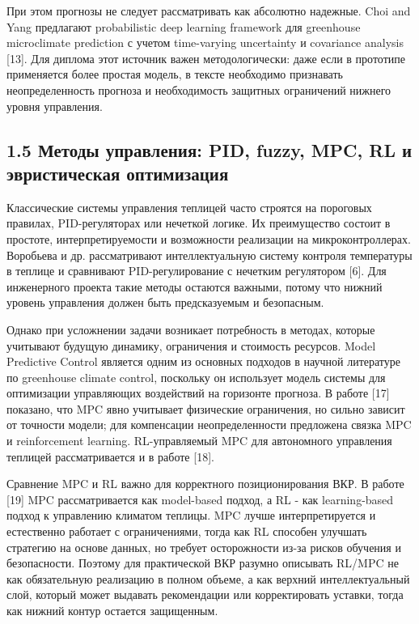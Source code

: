 \documentclass[a4paper,14pt]{extarticle}
\begin{document}
При этом прогнозы не следует рассматривать как абсолютно надежные. Choi
and Yang предлагают probabilistic deep learning framework для greenhouse
microclimate prediction с учетом time-varying uncertainty и covariance
analysis {[}13{]}. Для диплома этот источник важен методологически: даже
если в прототипе применяется более простая модель, в тексте необходимо
признавать неопределенность прогноза и необходимость защитных
ограничений нижнего уровня управления.

\hypertarget{ux43cux435ux442ux43eux434ux44b-ux443ux43fux440ux430ux432ux43bux435ux43dux438ux44f-pid-fuzzy-mpc-rl-ux438-ux44dux432ux440ux438ux441ux442ux438ux447ux435ux441ux43aux430ux44f-ux43eux43fux442ux438ux43cux438ux437ux430ux446ux438ux44f}{%
\subsection{1.5 Методы управления: PID, fuzzy, MPC, RL и эвристическая
оптимизация}\label{ux43cux435ux442ux43eux434ux44b-ux443ux43fux440ux430ux432ux43bux435ux43dux438ux44f-pid-fuzzy-mpc-rl-ux438-ux44dux432ux440ux438ux441ux442ux438ux447ux435ux441ux43aux430ux44f-ux43eux43fux442ux438ux43cux438ux437ux430ux446ux438ux44f}}

Классические системы управления теплицей часто строятся на пороговых
правилах, PID-регуляторах или нечеткой логике. Их преимущество состоит в
простоте, интерпретируемости и возможности реализации на
микроконтроллерах. Воробьева и др. рассматривают интеллектуальную
систему контроля температуры в теплице и сравнивают PID-регулирование с
нечетким регулятором {[}6{]}. Для инженерного проекта такие методы
остаются важными, потому что нижний уровень управления должен быть
предсказуемым и безопасным.

Однако при усложнении задачи возникает потребность в методах, которые
учитывают будущую динамику, ограничения и стоимость ресурсов. Model
Predictive Control является одним из основных подходов в научной
литературе по greenhouse climate control, поскольку он использует модель
системы для оптимизации управляющих воздействий на горизонте прогноза. В
работе {[}17{]} показано, что MPC явно учитывает физические ограничения,
но сильно зависит от точности модели; для компенсации неопределенности
предложена связка MPC и reinforcement learning. RL-управляемый MPC для
автономного управления теплицей рассматривается и в работе {[}18{]}.

Сравнение MPC и RL важно для корректного позиционирования ВКР. В работе
{[}19{]} MPC рассматривается как model-based подход, а RL - как
learning-based подход к управлению климатом теплицы. MPC лучше
интерпретируется и естественно работает с ограничениями, тогда как RL
способен улучшать стратегию на основе данных, но требует осторожности
из-за рисков обучения и безопасности. Поэтому для практической ВКР
разумно описывать RL/MPC не как обязательную реализацию в полном объеме,
а как верхний интеллектуальный слой, который может выдавать рекомендации
или корректировать уставки, тогда как нижний контур остается защищенным.
\end{document}
